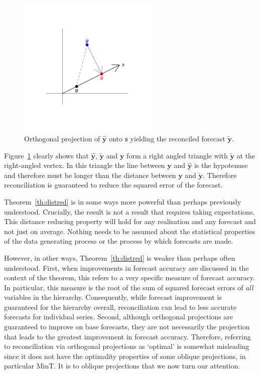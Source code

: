 \documentclass[12pt]{article}
\theoremstyle{definition}
\begin{document}
\begin{figure}[!hbt]
  \centering \includegraphics[width=0.6\textwidth]{Figs/orth_pointforerec_schematic.pdf}
  \caption{Orthogonal projection of $\hat{\bm{y}}$ onto $\mathfrak{s}$ yielding the reconciled forecast $\tilde{\bm{y}}$.}\label{fig:Schematic_OLSRecon}
\end{figure}

Figure~\ref{fig:Schematic_OLSRecon} clearly shows that $\hat{\bm{y}}$, $\tilde{\bm{y}}$ and $\bm{y}$ form a right angled triangle with $\tilde{\bm{y}}$ at the right-angled vertex. In this triangle the line between $\bm{y}$ and $\hat{\bm{y}}$ is the hypotenuse and therefore must be longer than the distance between $\bm{y}$ and $\tilde{\bm{y}}$. Therefore reconciliation is guaranteed to reduce the squared error of the forecast.

Theorem~\ref{th:distred} is in some ways more powerful than perhaps previously understood. Crucially, the result is not a result that requires taking expectations. This distance reducing property will hold for any realisation and any forecast and not just on average. Nothing needs to be assumed about the statistical properties of the data generating process or the process by which forecasts are made.

However, in other ways, Theorem~\ref{th:distred} is weaker than perhaps often understood. First, when improvements in forecast accuracy are discussed in the context of the theorem, this refers to a very specific measure of forecast accuracy. In particular, this measure is the root of the sum of squared forecast errors of \emph{all} variables in the hierarchy. Consequently, while forecast improvement is guaranteed for the hierarchy overall, reconciliation can lead to less accurate forecasts for individual series. Second, although orthogonal projections are guaranteed to improve on base forecasts, they are not necessarily the projection that leads to the greatest improvement in forecast accuracy. Therefore, referring to reconciliation via orthogonal projections as `optimal' is somewhat misleading since it does not have the optimality properties of some oblique projections, in particular MinT\@. It is to oblique projections that we now turn our attention.
\end{document}
